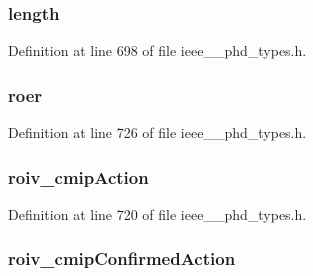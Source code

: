 \subsubsection[{length}]{ length}\label{struct___d_a_t_a__apdu_a3743679e4ff85e3e1b3fc2e59973fbb3}


Definition at line 698 of file ieee\+\_\+\_\+phd\+\_\+types.\+h.

\hypertarget{struct___d_a_t_a__apdu_a768fc350526f93d1e5d02875f6050c05}{}
\subsubsection[{roer}]{ roer}\label{struct___d_a_t_a__apdu_a768fc350526f93d1e5d02875f6050c05}


Definition at line 726 of file ieee\+\_\+\_\+phd\+\_\+types.\+h.

\hypertarget{struct___d_a_t_a__apdu_abad510647acd238e619612830f561188}{}
\subsubsection[{roiv\+\_\+cmip\+Action}]{ roiv\+\_\+cmip\+Action}\label{struct___d_a_t_a__apdu_abad510647acd238e619612830f561188}


Definition at line 720 of file ieee\+\_\+\_\+phd\+\_\+types.\+h.

\hypertarget{struct___d_a_t_a__apdu_ab78ef96e3a5c04a9409f379f90fb0acb}{}
\subsubsection[{roiv\+\_\+cmip\+Confirmed\+Action}]{ roiv\+\_\+cmip\+Confirmed\+Action}\label{struct___d_a_t_a__apdu_ab78ef96e3a5c04a9409f379f90fb0acb}



